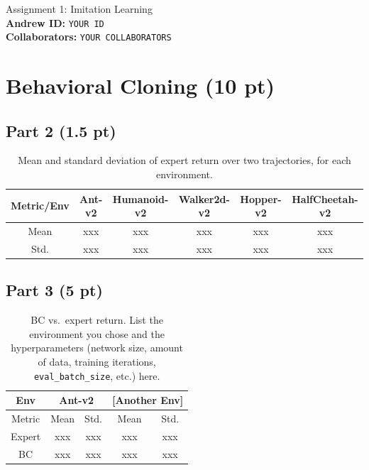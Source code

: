 \documentclass{article}
\begin{document}
\begin{center}
    {\Large Assignment 1: Imitation Learning} \\
    \vspace{.25cm}
    \textbf{Andrew ID:} \texttt{YOUR ID} \\
    \textbf{Collaborators:} \texttt{YOUR COLLABORATORS}
\end{center}


\section{Behavioral Cloning (10 pt)}

\subsection{Part 2 (1.5 pt)}
\begin{table}[!h]
  \centering
  \caption{Mean and standard deviation of expert return over two trajectories, for each environment.}
  \begin{tabular}{cccccc}
    \toprule
    Metric/Env & Ant-v2 & Humanoid-v2 & Walker2d-v2 & Hopper-v2 & HalfCheetah-v2 \\
    \midrule
    Mean  & xxx & xxx & xxx & xxx & xxx \\
    Std.  & xxx & xxx & xxx & xxx & xxx \\
    \bottomrule
  \end{tabular}
  \label{tab:p2}
\end{table}

\subsection{Part 3 (5 pt)}
\begin{table}[htbp]
  \centering
  \caption{BC vs.\ expert return. List the environment you chose and the hyperparameters (network size, amount of data, training iterations, \texttt{eval\_batch\_size}, etc.) here.}
  \begin{tabular}{ccccc}
    \toprule
    Env   & \multicolumn{2}{c}{Ant-v2} & \multicolumn{2}{c}{[Another Env]} \\
    \midrule
    Metric & Mean  & Std.  & Mean  & Std. \\
    Expert & xxx & xxx & xxx & xxx \\
    BC    & xxx & xxx & xxx & xxx \\
    \bottomrule
  \end{tabular}
  \label{tab:p3}
\end{table}
\end{document}
